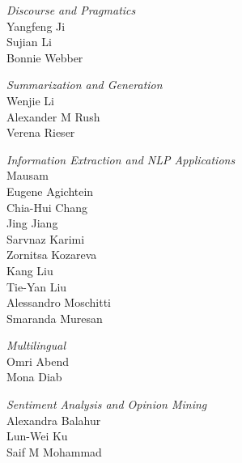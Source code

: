 \emph{Discourse and Pragmatics} \\
\hspace*{0.2in} Yangfeng Ji \\
\hspace*{0.2in} Sujian Li \\
\hspace*{0.2in} Bonnie Webber
 
\emph{Summarization and Generation} \\
\hspace*{0.2in} Wenjie Li \\
\hspace*{0.2in} Alexander M Rush \\
\hspace*{0.2in} Verena Rieser

\emph{Information Extraction and NLP Applications} \\
\hspace*{0.2in} Mausam \\
\hspace*{0.2in} Eugene Agichtein \\
\hspace*{0.2in} Chia-Hui Chang \\
\hspace*{0.2in} Jing Jiang \\
\hspace*{0.2in} Sarvnaz Karimi \\
\hspace*{0.2in} Zornitsa Kozareva \\
\hspace*{0.2in} Kang Liu \\
\hspace*{0.2in} Tie-Yan Liu \\
\hspace*{0.2in} Alessandro Moschitti \\
\hspace*{0.2in} Smaranda Muresan

\emph{Multilingual} \\
\hspace*{0.2in} Omri Abend \\
\hspace*{0.2in} Mona Diab

\emph{Sentiment Analysis and Opinion Mining} \\
\hspace*{0.2in} Alexandra Balahur \\
\hspace*{0.2in} Lun-Wei Ku \\
\hspace*{0.2in} Saif M Mohammad

